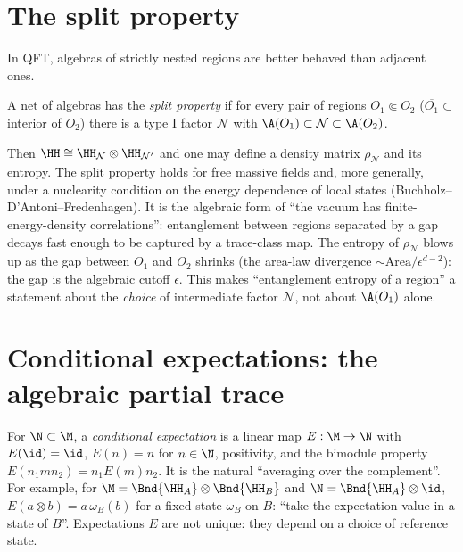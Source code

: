 \section{The split property}

In QFT, algebras of strictly nested regions are better behaved than adjacent ones.

\begin{definition}
A net of algebras has the \emph{split property} if for every pair of regions $O_1\Subset O_2$ ($\overline{O_1}\subset$ interior of $O_2$) there is a type I factor $\mathcal N$ with $\A(O_1)\subset\mathcal N\subset\A(O_2)$.
\end{definition}

Then $\HH\cong\HH_{\mathcal N}\otimes\HH_{\mathcal N'}$ and one may define a density matrix $\rho_{\mathcal N}$ and its entropy. The split property holds for free massive fields and, more generally, under a nuclearity condition on the energy dependence of local states (Buchholz--D'Antoni--Fredenhagen). It is the algebraic form of ``the vacuum has finite-energy-density correlations'': entanglement between regions separated by a gap decays fast enough to be captured by a trace-class map. The entropy of $\rho_{\mathcal N}$ blows up as the gap between $O_1$ and $O_2$ shrinks (the area-law divergence $\sim\mathrm{Area}/\epsilon^{d-2}$): the gap is the algebraic cutoff $\epsilon$. This makes ``entanglement entropy of a region'' a statement about the \emph{choice} of intermediate factor $\mathcal N$, not about $\A(O_1)$ alone.

\section{Conditional expectations: the algebraic partial trace}

For $\N\subset\M$, a \emph{conditional expectation} is a linear map $E:\M\to\N$ with $E(\id)=\id$, $E(n)=n$ for $n\in\N$, positivity, and the bimodule property $E(n_1mn_2)=n_1E(m)n_2$. It is the natural ``averaging over the complement''. For example, for $\M=\Bnd{\HH_A}\otimes\Bnd{\HH_B}$ and $\N=\Bnd{\HH_A}\otimes\id$, $E(a\otimes b)=a\,\omega_B(b)$ for a fixed state $\omega_B$ on $B$: ``take the expectation value in a state of $B$''. Expectations $E$ are not unique: they depend on a choice of reference state.

